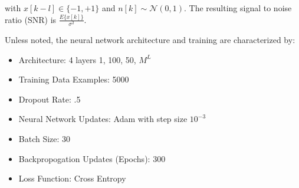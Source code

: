 \documentclass[12pt,a4paper]{report}
\begin{document}
with $x[k-l] \in \{ -1, +1\}$ and $n[k]  \sim \mathcal{N}(0,1)$.  
The resulting signal to noise ratio (SNR) is 
$\frac{E\{x[k]\}}{\sigma^2}$.

Unless noted, the neural network architecture and training are characterized by:
\begin{itemize}
\item Architecture: 4 layers {1, 100, 50, $M^L$}
\item Training Data Examples: 5000
\item Dropout Rate: .5
\item Neural Network Updates: Adam with step size $10^{-3}$ \cite{kingma2014adam}
\item Batch Size: 30 
\item Backpropogation Updates (Epochs): 300
\item Loss Function: Cross Entropy
\end{itemize}
\end{document}
